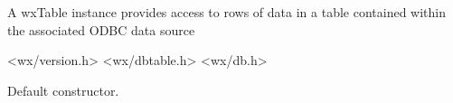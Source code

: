 \section{}\label{wxtable}

A wxTable instance provides access to rows of data in
a table contained within the associated ODBC data source


<wx/version.h>
<wx/dbtable.h>
<wx/db.h>






\label{wxtableconstr}


Default constructor.


